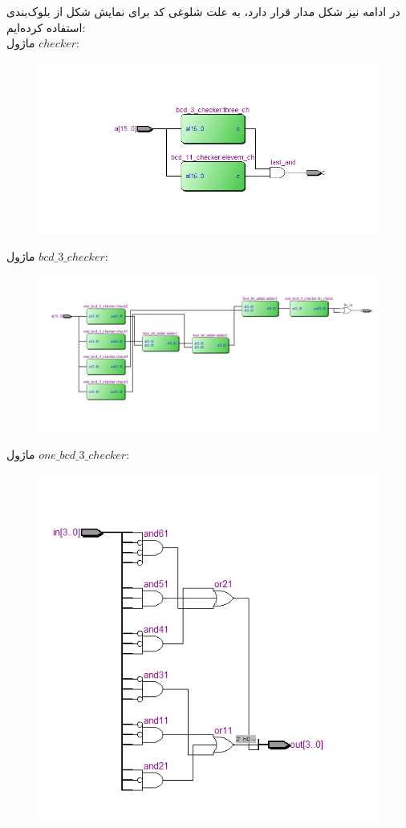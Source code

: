 \documentclass[a4paper,12pt]{article}
\begin{document}
\pagebreak
در ادامه نیز شکل مدار قرار دارد، به علت شلوغی کد برای نمایش شکل از بلوک‌‌‌بندی استفاده کرده‌ایم:\\
ماژول $checker$:
\begin{figure}[H]
 \centering
  \includegraphics[width=0.8\linewidth]{sh1}
\end{figure}
ماژول
$bcd\_3\_checker$:
\begin{figure}[H]
 \centering
  \includegraphics[width=0.8\linewidth]{sh2}
\end{figure}
ماژول
$one\_bcd\_3\_checker$:
\begin{figure}[H]
 \centering
  \includegraphics[width=0.8\linewidth]{sh3}
\end{figure}
\end{document}

